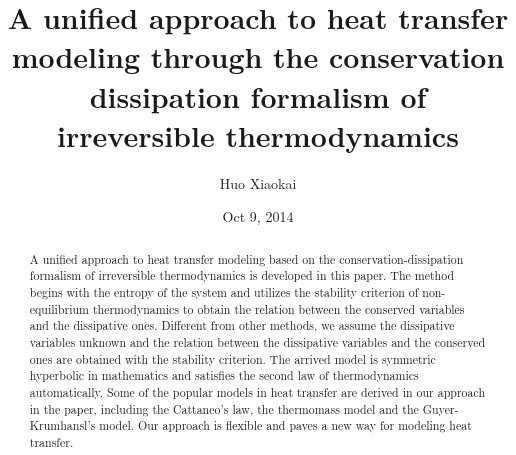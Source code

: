 \documentclass[a4paper]{article}
\title{A unified approach to heat transfer modeling through the conservation dissipation formalism of irreversible thermodynamics}
\author{Huo Xiaokai}
\date{Oct 9, 2014}
\begin{document}
\maketitle

\begin{abstract} 
A unified approach to heat transfer modeling based on the conservation-dissipation formalism of irreversible thermodynamics is developed in this paper. The method begins with the entropy of the system and utilizes the stability criterion of non-equilibrium thermodynamics to obtain the relation between the conserved variables and the dissipative ones. Different from other methods, we assume the dissipative variables unknown and the relation between the dissipative variables and the conserved ones are obtained with the stability criterion. The arrived model is symmetric hyperbolic in mathematics and satisfies the second law of thermodynamics automatically. Some of the popular models in heat transfer are derived in our approach in the paper, including the Cattaneo's law, the thermomass model and the Guyer-Krumhansl's model. Our approach is flexible and paves a new way for modeling heat transfer. 
\end{abstract}
\end{document}
